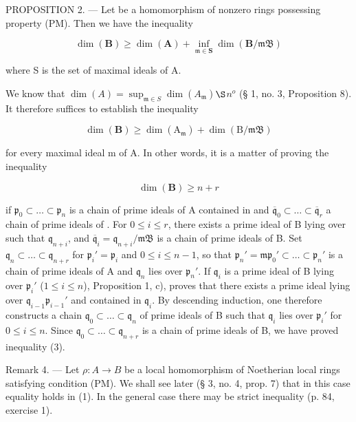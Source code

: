 PROPOSITION 2. --- Let  be a homomorphism of nonzero rings possessing property (PM). Then we have the inequality

\[
\dim (\mathbf {B}) \geqslant \dim (\mathbf {A}) + \inf _ {\mathfrak {m} \in \mathbf {S}} \dim (\mathbf {B} / \mathfrak {m B})\tag{1}
\]

where S is the set of maximal ideals of A.

We know that \(\dim(A) = \sup_{\mathfrak m \in S} \dim(A_{\mathfrak m})\)\(\S\)\(n^o\) (§ 1, no. 3, Proposition 8). It therefore suffices to establish the inequality

\[
\dim (\mathbf {B}) \geqslant \dim (\mathrm{A} _ {\mathfrak {m}}) + \dim (\mathrm{B} / \mathfrak {m B})\tag{2}
\]

for every maximal ideal m of A. In other words, it is a matter of proving the inequality

\[
\dim (\mathbf {B}) \geqslant n + r\tag{3}
\]

if \(\mathfrak{p}_0\subset \ldots \subset \mathfrak{p}_n\) is a chain of prime ideals of A contained in  and \(\overline{\mathfrak{q}}_0\subset \ldots \subset \overline{\mathfrak{q}}_r\) a chain of prime ideals of . For \(0\leqslant i\leqslant r\), there exists a prime ideal  of B lying over  such that \(\mathfrak{q}_{n+i}\), and \(\overline{\mathfrak{q}}_i = \mathfrak{q}_{n + i} / \mathfrak{mB}\) is a chain of prime ideals of B. Set \(\mathfrak{q}_n\subset \ldots \subset \mathfrak{q}_{n + r}\) for \(\mathfrak{p}_i' = \mathfrak{p}_i\) and \(0\leqslant i\leqslant n-1\), so that \(\mathfrak{p}_n' = \mathfrak m\)\(\mathfrak{p}_0'\subset \ldots \subset \mathfrak{p}_n'\) is a chain of prime ideals of A and \(\mathfrak{q}_n\) lies over \(\mathfrak{p}_n'\). If \(\mathfrak{q}_i\) is a prime ideal of B lying over \(\mathfrak{p}_i'\) (\(1\leqslant i\leqslant n\)), Proposition 1, c), proves that there exists a prime ideal  lying over \(\mathfrak{q}_{i-1}\)\(\mathfrak{p}_{i-1}'\) and contained in \(\mathfrak{q}_i\). By descending induction, one therefore constructs a chain \(\mathfrak{q}_0\subset \ldots \subset \mathfrak{q}_n\) of prime ideals of B such that \(\mathfrak{q}_i\) lies over \(\mathfrak{p}_i'\) for \(0\leqslant i\leqslant n\). Since \(\mathfrak{q}_0\subset \ldots \subset \mathfrak{q}_{n+r}\) is a chain of prime ideals of B, we have proved inequality (3).

Remark 4. --- Let \(\rho: A \to B\) be a local homomorphism of Noetherian local rings satisfying condition (PM). We shall see later (§ 3, no. 4, prop. 7) that in this case equality holds in (1). In the general case there may be strict inequality (p. 84, exercise 1).

